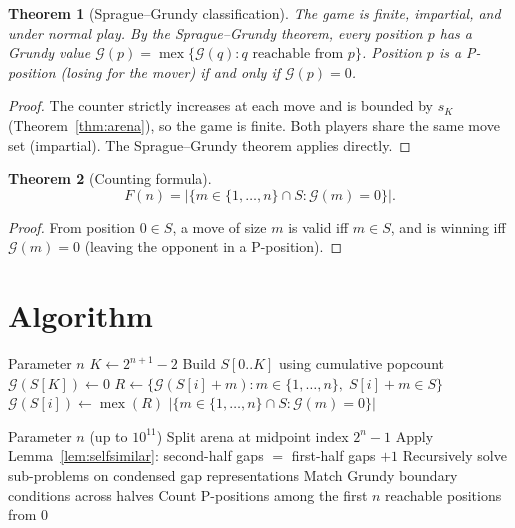 \documentclass[11pt,a4paper]{article}
\newtheorem{theorem}{Theorem}
\begin{document}
\begin{theorem}[Sprague--Grundy classification]
\label{thm:sg}
The game is finite, impartial, and under normal play. By the Sprague--Grundy theorem, every position $p$ has a Grundy value $\mathcal{G}(p) = \operatorname{mex}\{\mathcal{G}(q) : q \text{ reachable from } p\}$. Position $p$ is a P-position (losing for the mover) if and only if $\mathcal{G}(p) = 0$.
\end{theorem}

\begin{proof}
The counter strictly increases at each move and is bounded by $s_K$ (Theorem~\ref{thm:arena}), so the game is finite. Both players share the same move set (impartial). The Sprague--Grundy theorem applies directly.
\end{proof}

\begin{theorem}[Counting formula]
\label{thm:counting}
\[
F(n) = \bigl|\{m \in \{1, \ldots, n\} \cap S : \mathcal{G}(m) = 0\}\bigr|.
\]
\end{theorem}

\begin{proof}
From position $0 \in S$, a move of size $m$ is valid iff $m \in S$, and is winning iff $\mathcal{G}(m) = 0$ (leaving the opponent in a P-position).
\end{proof}

\section{Algorithm}

\begin{algorithm}[H]
\caption{Brute-Force: $F(n)$}
\begin{algorithmic}[1]
\Require Parameter $n$
\State $K \gets 2^{n+1} - 2$
\State Build $S[0..K]$ using cumulative popcount
\State $\mathcal{G}(S[K]) \gets 0$ 
    \State $R \gets \{\mathcal{G}(S[i]+m) : m \in \{1,\ldots,n\},\; S[i]+m \in S\}$
    \State $\mathcal{G}(S[i]) \gets \operatorname{mex}(R)$
\EndFor
\State \Return $|\{m \in \{1,\ldots,n\} \cap S : \mathcal{G}(m) = 0\}|$
\end{algorithmic}
\end{algorithm}

\begin{algorithm}[H]
\caption{Efficient: $F(n)$ via gap self-similarity}
\begin{algorithmic}[1]
\Require Parameter $n$ (up to $10^{11}$)
\State Split arena at midpoint index $2^n - 1$
\State Apply Lemma~\ref{lem:selfsimilar}: second-half gaps $=$ first-half gaps $+ 1$
\State Recursively solve sub-problems on condensed gap representations
\State Match Grundy boundary conditions across halves
\State Count P-positions among the first $n$ reachable positions from $0$
\end{algorithmic}
\end{algorithm}
\end{document}
